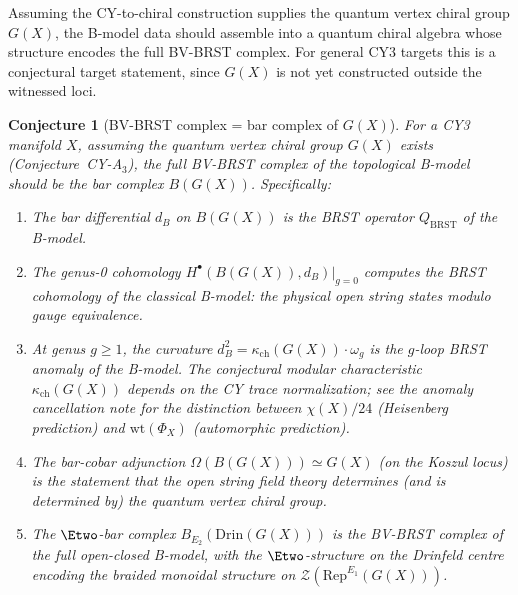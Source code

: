 \documentclass[11pt]{amsart}
\theoremstyle{plain}
\newtheorem{conjecture}[theorem]{Conjecture}
\theoremstyle{definition}
\theoremstyle{remark}
\newcommand{\Rep}{\mathrm{Rep}}
\newcommand{\BRST}{\mathrm{BRST}}
\newcommand{\cZ}{\mathcal{Z}}
\begin{document}
Assuming the CY-to-chiral construction supplies the quantum vertex
chiral group $G(X)$, the B-model data should assemble into a quantum
chiral algebra whose structure encodes the full BV-BRST complex. For
general CY3 targets this is a conjectural target statement, since
$G(X)$ is not yet constructed outside the witnessed loci.
\begin{conjecture}[BV-BRST complex = bar complex of $G(X)$]
\label{conj:cy3-bv-bar}
For a CY3 manifold $X$, assuming the quantum vertex chiral group $G(X)$ exists (Conjecture~CY-A$_3$), the full BV-BRST complex of the topological B-model should be the bar complex $B(G(X))$. Specifically:
\begin{enumerate}[label=(\roman*)]
 \item The bar differential $d_B$ on $B(G(X))$ is the BRST operator $Q_{\BRST}$ of the B-model.

 \item The genus-0 cohomology $H^\bullet(B(G(X)), d_B)|_{g=0}$ computes the BRST cohomology of the classical B-model: the physical open string states modulo gauge equivalence.

 \item At genus $g \geq 1$, the curvature $d_B^2 = \kappa_{\mathrm{ch}}(G(X)) \cdot \omega_g$ is the $g$-loop BRST anomaly of the B-model.
 The conjectural modular characteristic $\kappa_{\mathrm{ch}}(G(X))$ depends on the CY trace normalization; see the anomaly cancellation note for the distinction between $\chi(X)/24$ (Heisenberg prediction) and $\mathrm{wt}(\Phi_X)$ (automorphic prediction).

 \item The bar-cobar adjunction $\Omega(B(G(X))) \simeq G(X)$ (on the Koszul locus) is the statement that the open string field theory determines (and is determined by) the quantum vertex chiral group.

 \item The $\Etwo$-bar complex $B_{E_2}(\mathrm{Drin}(G(X)))$ is the BV-BRST complex of the full open-closed B-model, with the $\Etwo$-structure on the Drinfeld centre encoding the braided monoidal structure on $\cZ(\Rep^{E_1}(G(X)))$.
\end{enumerate}
\end{conjecture}
\end{document}
